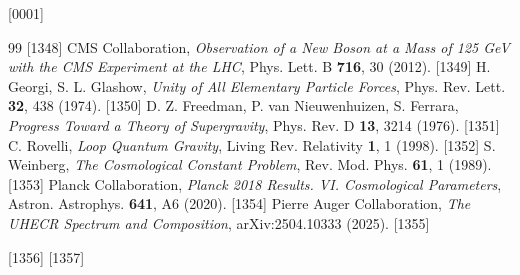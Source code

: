 [0001] \documentclass[12pt]{report}
[0002] \usepackage[utf8]{inputenc}
\begin{document}
\begin{thebibliography}{99}
[1348]  CMS Collaboration, \textit{Observation of a New Boson at a Mass of 125 GeV with the CMS Experiment at the LHC}, Phys. Lett. B \textbf{716}, 30 (2012).
[1349]  H. Georgi, S. L. Glashow, \textit{Unity of All Elementary Particle Forces}, Phys. Rev. Lett. \textbf{32}, 438 (1974).
[1350]  D. Z. Freedman, P. van Nieuwenhuizen, S. Ferrara, \textit{Progress Toward a Theory of Supergravity}, Phys. Rev. D \textbf{13}, 3214 (1976).
[1351]  C. Rovelli, \textit{Loop Quantum Gravity}, Living Rev. Relativity \textbf{1}, 1 (1998).
[1352]  S. Weinberg, \textit{The Cosmological Constant Problem}, Rev. Mod. Phys. \textbf{61}, 1 (1989).
[1353]  Planck Collaboration, \textit{Planck 2018 Results. VI. Cosmological Parameters}, Astron. Astrophys. \textbf{641}, A6 (2020).
[1354]  Pierre Auger Collaboration, \textit{The UHECR Spectrum and Composition}, arXiv:2504.10333 (2025).
[1355] \end{thebibliography}
[1356] 
[1357] 
\end{document}
